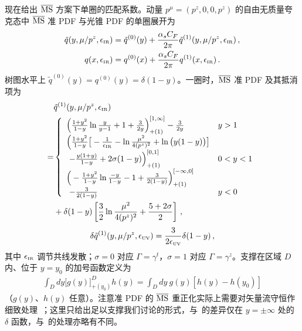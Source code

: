 现在给出 ${\overline{\rm MS}}$ 方案下单圈的匹配系数。动量 $p^\mu=(p^z,0,0,p^z)$ 的自由无质量夸克态中 ${\overline{\rm MS}}$ 准 PDF 与光锥 PDF 的单圈展开为
\begin{align}
	\tilde{q}(y,\mu/p^z,\epsilon_{\mbox{\tiny IR}}) &= \tilde{q}^{(0)}(y) + {\alpha_sC_F\over 2\pi}\tilde{q}^{(1)}(y,\mu/p^z,\epsilon_{\mbox{\tiny IR}})\,,\\
	q(x,\epsilon_{\mbox{\tiny IR}}) &= q^{(0)}(x) + {\alpha_sC_F\over 2\pi}q^{(1)}(x,\epsilon_{\mbox{\tiny IR}})\,.
\end{align}
树图水平上 $\tilde{q}^{(0)}(y) = q^{(0)}(y) = \delta(1-y)$。一圈时，${\overline{\rm MS}}$ 准 PDF 及其抵消项为~\cite{Izubuchi:2018srq}
\begin{align}\label{eq:qPDFren}
	&\tilde{q}^{(1)}(y,\mu/p^z,\epsilon_{\mbox{\tiny IR}}) \nonumber\\
	=&\left\{
	\begin{array}{ll}
		\Big({1+y^2\over 1-y}\ln {y\over y-1} + 1 + {3\over 2y}\Big)^{[1,\infty]}_{+(1)}- {3\over 2y} & y>1\\
		\Big({1+y^2\over 1-y}\big[- {1\over \epsilon_{\mbox{\tiny IR}}} - \ln{\mu^2\over 4(p^z)^2} + \ln\big(y(1-y)\big)\big] &\\
		\  - {y(1+y)\over 1-y}+ 2\sigma (1-y)\Big)^{[0,1]}_{+(1)}  &0<y<1\\
		\Big(-{1+y^2\over 1-y}\ln {-y\over 1-y} - 1 + {3\over 2(1-y)}\Big)^{[-\infty,0]}_{+(1)}&\\
		\ - {3\over 2(1-y)} & y<0
	\end{array}\right.\nonumber\\
	&+ \delta(1-y)\left[{3\over2}\ln{\mu^2\over 4(p^z)^2} + {5 + 2\sigma\over2}\right]\,,
\end{align}
\begin{align}
	\delta \tilde{q}^{(1)}(y,\mu/p^z,\epsilon_{\mbox{\tiny UV}})
	= {3\over 2\epsilon_{\mbox{\tiny UV}}}
	\delta(1-y)\,,
\end{align}
其中 $\epsilon_{\mbox{\tiny IR}}$ 调节共线发散；$\sigma=0$ 对应 $\Gamma=\gamma^t$，$\sigma=1$ 对应 $\Gamma=\gamma^z$。支撑在区域 $D$ 内、位于 $y=y_0$ 的加号函数定义为
\begin{align}
	\int_D\! dy \big[ g(y)\big]_{+(y_0)}^D h(y)\! =\! \int_D\! dy\ g(y) \left[ h(y)\! -\! h(y_0)\right]
\end{align}
（$g(y)$、$h(y)$ 任意）。注意准 PDF 的 ${\overline{\rm MS}}$ 重正化实际上需要对矢量流守恒作细致处理~\cite{Izubuchi:2018srq}；这里只给出足以支撑我们讨论的形式，与~\cite{Izubuchi:2018srq}的差异仅在 $y=\pm\infty$ 处的 $\delta$ 函数，与~\cite{Alexandrou:2019lfo}的处理亦略有不同。

